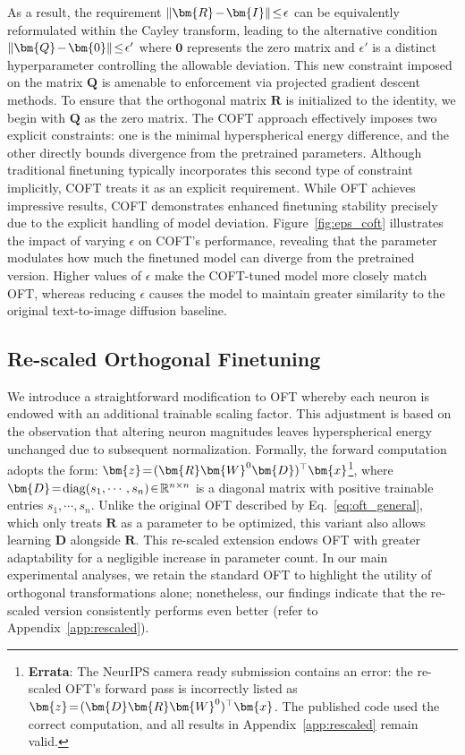 As a result, the requirement $\thickmuskip=2mu \medmuskip=2mu\|\bm{R}-\bm{I}\|\leq\epsilon$ can be equivalently reformulated within the Cayley transform, leading to the alternative condition $\thickmuskip=2mu \medmuskip=2mu \|\bm{Q}-\bm{0}\|\leq\epsilon'$ where $\bm{0}$ represents the zero matrix and $\epsilon'$ is a distinct hyperparameter controlling the allowable deviation. This new constraint imposed on the matrix $\bm{Q}$ is amenable to enforcement via projected gradient descent methods. To ensure that the orthogonal matrix $\bm{R}$ is initialized to the identity, we begin with $\bm{Q}$ as the zero matrix. The COFT approach effectively imposes two explicit constraints: one is the minimal hyperspherical energy difference, and the other directly bounds divergence from the pretrained parameters. Although traditional finetuning typically incorporates this second type of constraint implicitly, COFT treats it as an explicit requirement. While OFT achieves impressive results, COFT demonstrates enhanced finetuning stability precisely due to the explicit handling of model deviation. Figure~\ref{fig:eps_coft} illustrates the impact of varying $\epsilon$ on COFT’s performance, revealing that the parameter modulates how much the finetuned model can diverge from the pretrained version. Higher values of $\epsilon$ make the COFT-tuned model more closely match OFT, whereas reducing $\epsilon$ causes the model to maintain greater similarity to the original text-to-image diffusion baseline.

\subsection{Re-scaled Orthogonal Finetuning}

We introduce a straightforward modification to OFT whereby each neuron is endowed with an additional trainable scaling factor. This adjustment is based on the observation that altering neuron magnitudes leaves hyperspherical energy unchanged due to subsequent normalization. Formally, the forward computation adopts the form: $\thickmuskip=2mu \medmuskip=2mu\bm{z}=(\bm{R}\bm{W}^0\bm{D})^\top\bm{x}$\footnote{\textbf{Errata}: The NeurIPS camera ready submission contains an error: the re-scaled OFT’s forward pass is incorrectly listed as $\thickmuskip=2mu \medmuskip=2mu\bm{z}=(\bm{D}\bm{R}\bm{W}^0)^\top\bm{x}$. The published code used the correct computation, and all results in Appendix~\ref{app:rescaled} remain valid.}, where $\thickmuskip=2mu \medmuskip=2mu \bm{D}=\text{diag}(s_1,\cdots,s_n)\in\mathbb{R}^{n\times n}$ is a diagonal matrix with positive trainable entries $s_1,\cdots,s_n$. Unlike the original OFT described by Eq.~\eqref{eq:oft_general}, which only treats $\bm{R}$ as a parameter to be optimized, this variant also allows learning $\bm{D}$ alongside $\bm{R}$. This re-scaled extension endows OFT with greater adaptability for a negligible increase in parameter count. In our main experimental analyses, we retain the standard OFT to highlight the utility of orthogonal transformations alone; nonetheless, our findings indicate that the re-scaled version consistently performs even better (refer to Appendix~\ref{app:rescaled}).


